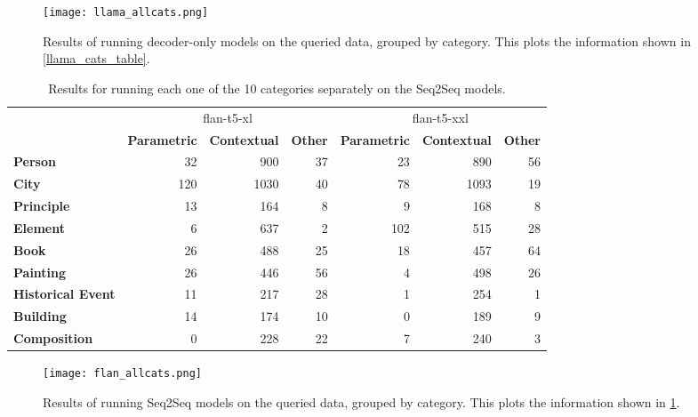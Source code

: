 \begin{figure}[htbp]
	\centering
	\texttt{[image: llama\_allcats.png]}
	\caption{Results of running decoder-only models on the queried data, grouped by category. This plots the information shown in \cref{llama_cats_table}.}
	\label{llama_cats_result}
\end{figure}

\begin{table}[h]
	\centering
	\footnotesize
	\begin{tabular}{>{\bfseries}l | r r r | r r r}
		\toprule
			& \multicolumn{3}{|c}{\ttfamily flan-t5-xl} & \multicolumn{3}{|c}{\ttfamily flan-t5-xxl} \\
			& \bfseries Parametric & \bfseries Contextual & \bfseries Other & \bfseries Parametric & \bfseries Contextual & \bfseries Other \\
		\midrule
			Person           &  32 &  900 & 37 &  23 &  890 & 56 \\
			City             & 120 & 1030 & 40 &  78 & 1093 & 19 \\
			Principle        &  13 &  164 &  8 &   9 &  168 &  8 \\
			Element          &   6 &  637 &  2 & 102 &  515 & 28 \\
			Book             &  26 &  488 & 25 &  18 &  457 & 64 \\
			Painting         &  26 &  446 & 56 &   4 &  498 & 26 \\
			Historical Event &  11 &  217 & 28 &   1 &  254 &  1 \\
			Building         &  14 &  174 & 10 &   0 &  189 &  9 \\
			Composition      &   0 &  228 & 22 &   7 &  240 &  3 \\
		\bottomrule
	\end{tabular}
	\caption{Results for running each one of the 10 categories separately on the Seq2Seq models.}
	\label{flan_cats_table}
\end{table}

\begin{figure}[htbp]
	\centering
	\texttt{[image: flan\_allcats.png]}
	\caption{Results of running Seq2Seq models on the queried data, grouped by category. This plots the information shown in \cref{flan_cats_table}.}
	\label{flan_cats_result}
\end{figure}
